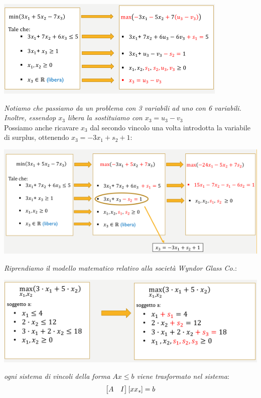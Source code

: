 \message{ !name(ro.tex)}\documentclass[a4paper,12pt, oneside]{book}
\begin{document}
\begin{esempio}
  \begin{center}
    \includegraphics[scale = 0.8]{img/sim2.png}
  \end{center}
  \textit{Notiamo che passiamo da un problema con 3 variabili ad uno
    con 6 variabili. Inoltre, essendop $x_3$ libera la sostituiamo
    con $x_3 = u_3-v_3$}\\
  Possiamo anche ricavare $x_3$ dal secondo vincolo una volta
  introdotta la variabile di surplus, ottenendo $x_3=-3x_1+s_2+1$:
  \begin{center}
    \includegraphics[scale = 0.8]{img/sim3.png}
  \end{center}
\end{esempio}
\begin{esempio}
  \textit{Riprendiamo il modello matematico relativo alla società
    Wyndor Glass Co.}:
  \begin{center}
    \includegraphics[scale = 0.8]{img/sim4.png}
  \end{center}
  \textit{ogni sistema di vincoli della forma $Ax \leq b$ viene
    trasformato nel sistema}:
  \[\left[
      \begin{matrix}
        A & I
      \end{matrix}
    \right]\left[
      x\\
      x_s
    \right]=b\]
\end{esempio}
\end{document}
